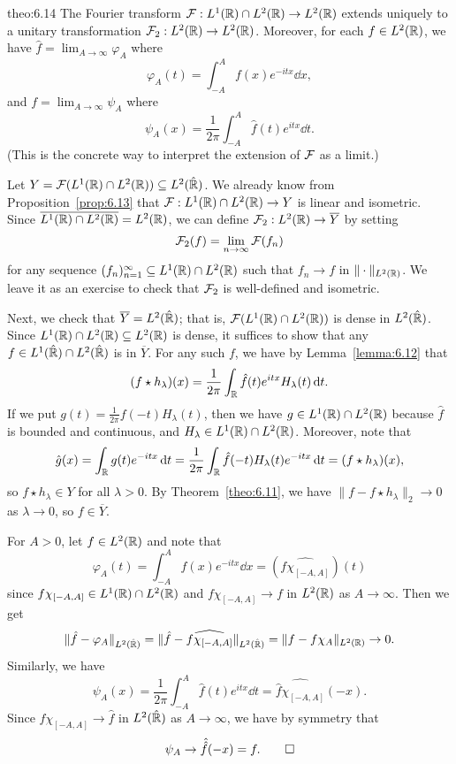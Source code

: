 \begin{theo}{theo:6.14}
    The Fourier transform ${\cal F} : L^1(\mathbb{R}) \cap L^2(\mathbb{R}) \to L^2(\mathbb{R})$ 
    extends uniquely to a unitary transformation ${\cal F}_2 
    : L^2(\mathbb{R}) \to L^2(\mathbb{R})$. Moreover, for each $f \in L^2(\mathbb{R})$, we have 
    $\hat f = \lim_{A\to\infty} \varphi_A$ where 
    \[ \varphi_A(t) = \int_{-A}^A f(x) e^{-itx}\dd x, \] 
    and $f = \lim_{A\to\infty} \psi_A$ where 
    \[ \psi_A(x) = \frac{1}{2\pi} \int_{-A}^A \hat f(t) e^{itx}\dd t. \] 
    (This is the concrete way to interpret the extension of ${\cal F}$ 
    as a limit.)
\end{theo}
\begin{pf}
    Let $Y = {\cal F}(L^1(\mathbb{R}) \cap L^2(\mathbb{R})) \subseteq L^2(\hat {\mathbb{R}})$. 
    We already know from Proposition~\ref{prop:6.13} that 
    ${\cal F} : L^1(\mathbb{R}) \cap L^2(\mathbb{R}) \to Y$ is linear and isometric. 
    Since $\overline{L^1(\mathbb{R}) \cap L^2(\mathbb{R})} = L^2(\mathbb{R})$, we can define 
    ${\cal F}_2 : L^2(\mathbb{R}) \to \overline{Y}$ by setting 
    \[ {\cal F}_2(f) = \lim_{n\to\infty} {\cal F}(f_n) \] 
    for any sequence $(f_n)_{n=1}^\infty \subseteq L^1(\mathbb{R}) \cap L^2(\mathbb{R})$ 
    such that $f_n \to f$ in $\|\cdot\|_{L^2(\mathbb{R})}$. We leave it 
    as an exercise to check that ${\cal F}_2$ is well-defined and isometric. 

    Next, we check that $\overline{Y} = L^2(\hat {\mathbb{R}})$; that is, 
    ${\cal F}(L^1(\mathbb{R}) \cap L^2(\mathbb{R}))$ is dense in $L^2(\hat {\mathbb{R}})$. 
    Since $L^1(\mathbb{R}) \cap L^2(\mathbb{R}) \subseteq L^2(\mathbb{R})$ is dense, it suffices 
    to show that any $f \in L^1(\hat {\mathbb{R}}) \cap L^2(\hat {\mathbb{R}})$ is in $\overline{Y}$. 
    For any such $f$, we have by Lemma~\ref{lemma:6.12} that 
    \[ (f \star h_\lambda)(x) = \frac{1}{2\pi} \int_{\mathbb{R}} \hat f(t) e^{itx} H_\lambda(t)\,\mathrm{d} t. \] 
    If we put $g(t) = \frac{1}{2\pi} f(-t)H_\lambda(t)$, then we have $g \in 
    L^1(\mathbb{R}) \cap L^2(\mathbb{R})$ because $\hat f$ is bounded and continuous, 
    and $H_\lambda \in L^1(\mathbb{R}) \cap L^2(\mathbb{R})$. Moreover, note that 
    \[ \hat g(x) = \int_{\mathbb{R}} g(t) e^{-itx}\,\mathrm{d} t = 
    \frac{1}{2\pi} \int_{\mathbb{R}} \hat f(-t) H_\lambda(t) e^{-itx}\,\mathrm{d} t = 
    (f \star h_\lambda)(x), \] 
    so $f \star h_\lambda \in Y$ for all $\lambda > 0$. By Theorem~\ref{theo:6.11},
    we have $\|f - f \star h_\lambda\|_2 \to 0$ as $\lambda \to 0$, 
    so $f \in \overline{Y}$. 

    For $A > 0$, let $f \in L^2(\mathbb{R})$ and note that 
    \[ \varphi_A(t) = \int_{-A}^A f(x) e^{-itx}\dd x = 
    (\widehat{f\chi_{[-A, A]}})(t) \] 
    since $f\chi_{[-A, A]} \in L^1(\mathbb{R}) \cap L^2(\mathbb{R})$ and 
    $f\chi_{[-A, A]} \to f$ in $L^2(\mathbb{R})$ as $A \to \infty$. Then we get 
    \[ \|\hat f - \varphi_A\|_{L^2(\hat{\mathbb{R}})} = 
    \|\hat f - \widehat{f\chi_{[-A, A]}}\|_{L^2(\hat{\mathbb{R}})} = 
    \|f - f\chi_A\|_{L^2(\mathbb{R})} \to 0. \] 
    Similarly, we have 
    \[ \psi_A(x) = \frac{1}{2\pi} \int_{-A}^A \hat f(t) e^{itx} \dd t = 
    \widehat{\hat f \chi_{[-A, A]}}(-x). \] 
    Since $\hat f\chi_{[-A, A]} \to \hat f$ in $L^2(\hat {\mathbb{R}})$ as $A \to \infty$, 
    we have by symmetry that 
    \[ \psi_A \to \hat{\hat{f}}(-x) = f. \qedhere \] 
\end{pf}

